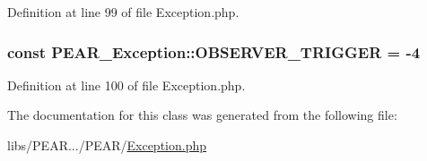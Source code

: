 Definition at line 99 of file Exception.\+php.

\subsubsection[{\texorpdfstring{O\+B\+S\+E\+R\+V\+E\+R\+\_\+\+T\+R\+I\+G\+G\+ER}{OBSERVER_TRIGGER}}]{\setlength{\rightskip}{0pt plus 5cm}const P\+E\+A\+R\+\_\+\+Exception\+::\+O\+B\+S\+E\+R\+V\+E\+R\+\_\+\+T\+R\+I\+G\+G\+ER = -\/4}\hypertarget{classPEAR__Exception_a0bf6d43a80c7f3bc2c7cfae062ff4477}{}\label{classPEAR__Exception_a0bf6d43a80c7f3bc2c7cfae062ff4477}


Definition at line 100 of file Exception.\+php.



The documentation for this class was generated from the following file\+:\begin{DoxyCompactItemize}
\item 
libs/\+P\+E\+A\+R.../\+P\+E\+A\+R/\hyperlink{PEAR_2Exception_8php}{Exception.\+php}\end{DoxyCompactItemize}
